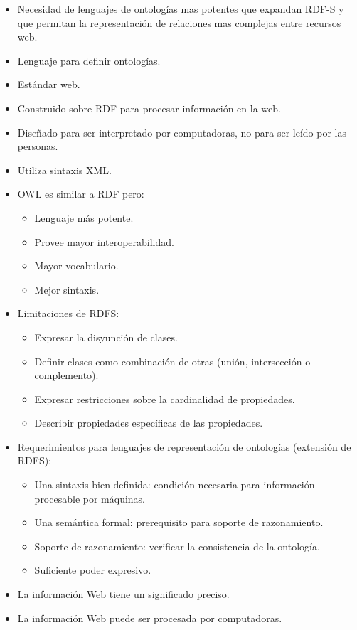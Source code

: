 \documentclass[a4paper,12pt,twoside,final,spanish]{article}
\begin{document}
\begin{itemize}
\item Necesidad de lenguajes de ontologías mas potentes que expandan RDF-S y que permitan la representación de relaciones mas complejas entre recursos web.
\item Lenguaje para definir ontologías.
\item Estándar web.
\item Construido sobre RDF para procesar información en la web.
\item Diseñado para ser interpretado por computadoras, no para ser leído por las personas.
\item Utiliza sintaxis XML.
\item OWL es similar a RDF pero:
	\begin{itemize}
	\item Lenguaje más potente.
	\item Provee mayor interoperabilidad.
	\item Mayor vocabulario.
	\item Mejor sintaxis.
	\end{itemize}
\item Limitaciones de RDFS:
	\begin{itemize}
	\item  Expresar la disyunción de clases.
	\item Definir clases como combinación de otras (unión, intersección o 					complemento).
	\item Expresar restricciones sobre la cardinalidad de propiedades.
	\item Describir propiedades específicas de las propiedades.
	\end{itemize}
\item Requerimientos para lenguajes de representación de ontologías (extensión de 	RDFS):
	\begin{itemize}
	\item Una sintaxis bien definida: condición necesaria para información procesable 		por máquinas.
	\item Una semántica formal: prerequisito para soporte de razonamiento.
	\item Soporte de razonamiento: verificar la consistencia de la ontología.
	\item Suficiente poder expresivo.
	\end{itemize}
\item La información Web tiene un significado preciso.
\item La información Web puede ser procesada por computadoras.

\end{itemize}
\end{document}
